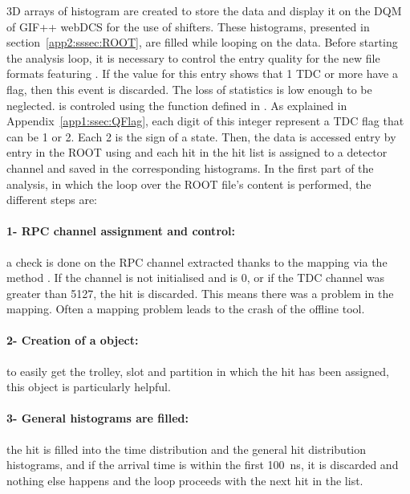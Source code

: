 	3D arrays of histogram are created to store the data and display it on the DQM of GIF++ webDCS for the use of shifters. These histograms, presented in section~\ref{app2:sssec:ROOT}, are filled while looping on the data. Before starting the analysis loop, it is necessary to control the entry quality for the new file formats featuring . If the  value for this entry shows that 1 TDC or more have a  flag, then this event is discarded. The loss of statistics is low enough to be neglected.  is controled using the function  defined in . As explained in Appendix~\ref{app1:ssec:QFlag}, each digit of this integer represent a TDC flag that can be 1 or 2. Each 2 is the sign of a  state. Then, the data is accessed entry by entry in the ROOT  using  and each hit in the hit list is assigned to a detector channel and saved in the corresponding histograms. In the first part of the analysis, in which the loop over the ROOT file's content is performed, the different steps are:
	
	\paragraph{1- RPC channel assignment and control:} a check is done on the RPC channel extracted thanks to the mapping via the method . If the channel is not initialised and is 0, or if the TDC channel was greater than 5127, the hit is discarded. This means there was a problem in the mapping. Often a mapping problem leads to the crash of the offline tool.
	
	\paragraph{2- Creation of a  object:} to easily get the trolley, slot and partition in which the hit has been assigned, this object is particularly helpful.
	
	\paragraph{3- General histograms are filled:} the hit is filled into the time distribution and the general hit distribution histograms, and if the arrival time is within the first \SI{100}{ns}, it is discarded and nothing else happens and the loop proceeds with the next hit in the list.
	
